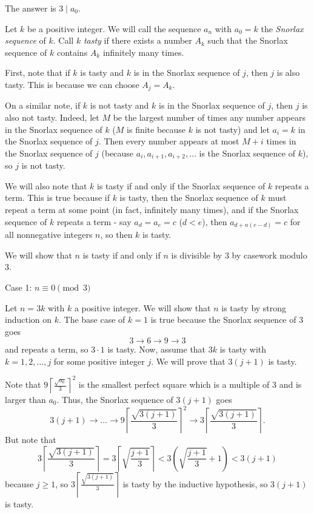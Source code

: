 The answer is $3\mid a_0$.

Let $k$ be a positive integer. We will call the sequence $a_n$ with $a_0=k$ the \emph{Snorlax sequence} of $k$. Call $k$ \emph{tasty} if there exists a number $A_k$ such that the Snorlax sequence of $k$ contains $A_k$ infinitely many times.

First, note that if $k$ is tasty and $k$ is in the Snorlax sequence of $j$, then $j$ is also tasty. This is because we can choose $A_j=A_k$.

On a similar note, if $k$ is not tasty and $k$ is in the Snorlax sequence of $j$, then $j$ is also not tasty. Indeed, let $M$ be the largest number of times any number appears in the Snorlax sequence of $k$ ($M$ is finite because $k$ is not tasty) and let $a_i=k$ in the Snorlax sequence of $j$. Then every number appears at most $M+i$ times in the Snorlax sequence of $j$ (because $a_i,a_{i+1},a_{i+2},\ldots$ is the Snorlax sequence of $k$), so $j$ is not tasty.

We will also note that $k$ is tasty if and only if the Snorlax sequence of $k$ repeats a term. This is true because if $k$ is tasty, then the Snorlax sequence of $k$ must repeat a term at some point (in fact, infinitely many times), and if the Snorlax sequence of $k$ repeats a term - say $a_d=a_e=c$ ($d<e$), then $a_{d+n\left(e-d\right)}=c$ for all nonnegative integers $n$, so then $k$ is tasty.

We will show that $n$ is tasty if and only if $n$ is divisible by $3$ by casework modulo $3$.

Case 1: $n\equiv0\pmod3$

Let $n=3k$ with $k$ a positive integer. We will show that $n$ is tasty by strong induction on $k$. The base case of $k=1$ is true because the Snorlax sequence of $3$ goes \[3\rightarrow6\rightarrow9\rightarrow3\] and repeats a term, so $3\cdot1$ is tasty. Now, assume that $3k$ is tasty with $k=1,2,\ldots,j$ for some positive integer $j$. We will prove that $3\left(j+1\right)$ is tasty.

Note that $9\left\lceil\frac{\sqrt{a_0}}{3}\right\rceil^2$ is the smallest perfect square which is a multiple of $3$ and is larger than $a_0$. Thus, the Snorlax sequence of $3\left(j+1\right)$ goes \[3\left(j+1\right)\rightarrow\ldots\rightarrow9\left\lceil\frac{\sqrt{3\left(j+1\right)}}{3}\right\rceil^2\rightarrow3\left\lceil\frac{\sqrt{3\left(j+1\right)}}{3}\right\rceil.\] But note that \[3\left\lceil\frac{\sqrt{3\left(j+1\right)}}{3}\right\rceil=3\left\lceil\sqrt{\frac{j+1}{3}}\right\rceil<3\left(\sqrt{\frac{j+1}{3}}+1\right)<3\left(j+1\right)\] because $j\geq1$, so $3\left\lceil\frac{\sqrt{3\left(j+1\right)}}{3}\right\rceil$ is tasty by the inductive hypothesis, so $3\left(j+1\right)$ is tasty.

